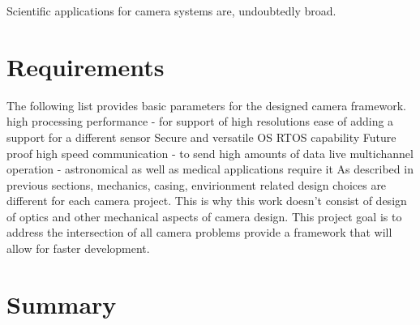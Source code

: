 Scientific applications for camera systems are, undoubtedly broad.

\section{Requirements}
The following list provides basic parameters for the designed camera framework.    
high processing performance - for support of high resolutions
ease of adding a support for a different sensor
Secure and versatile OS
RTOS capability
Future proof
high speed communication - to send high amounts of data live
multichannel operation - astronomical as well as medical applications require it
As described in previous sections, mechanics, casing, envirionment related design choices are different for
each camera project. This is why this work doesn't consist of design of optics and other mechanical aspects of
camera design. This project goal is to address the intersection of all camera problems provide a framework that
will allow for faster development.

\section{Summary}



